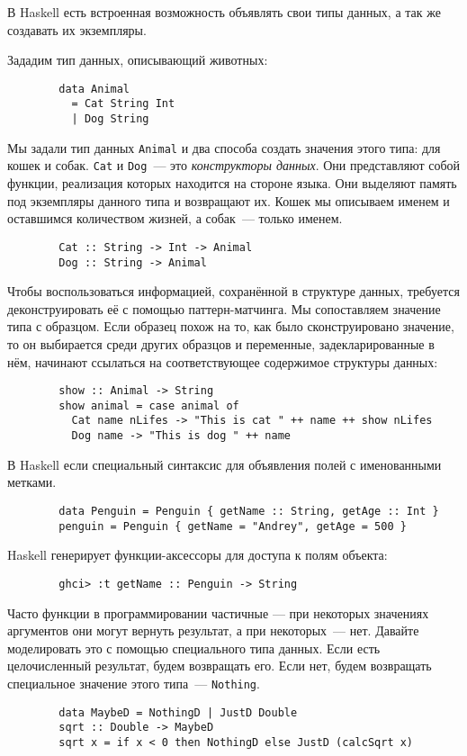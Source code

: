\documentclass[12pt]{article}
\newcommand{\point}[1]{{\color{blue}\textit{#1}}} %
\begin{document}
    В Haskell есть встроенная возможность объявлять свои типы данных, а так же создавать их экземпляры.

    Зададим тип данных, описывающий животных:
    \begin{verbatim}
        data Animal
          = Cat String Int
          | Dog String
    \end{verbatim}

    Мы задали тип данных \texttt{Animal} и два способа создать значения этого типа: для кошек и собак.
    \texttt{Cat} и \texttt{Dog}~--- это \point{конструкторы данных}.
    Они представляют собой функции, реализация которых находится на стороне языка.
    Они выделяют память под экземпляры данного типа и возвращают их.
    Кошек мы описываем именем и оставшимся количеством жизней, а собак~--- только именем.
    \begin{verbatim}
        Cat :: String -> Int -> Animal
        Dog :: String -> Animal
    \end{verbatim}

    Чтобы воспользоваться информацией, сохранённой в структуре данных, требуется деконструировать её с помощью паттерн-матчинга.
    Мы сопоставляем значение типа с образцом.
    Если образец похож на то, как было сконструировано значение, то он выбирается среди других образцов и переменные, задекларированные в нём, начинают ссылаться на соответствующее содержимое структуры данных:
    \begin{verbatim}
        show :: Animal -> String
        show animal = case animal of
          Cat name nLifes -> "This is cat " ++ name ++ show nLifes
          Dog name -> "This is dog " ++ name
    \end{verbatim}

    В Haskell если специальный синтаксис для объявления полей с именованными метками.
    \begin{verbatim}
        data Penguin = Penguin { getName :: String, getAge :: Int }
        penguin = Penguin { getName = "Andrey", getAge = 500 }
    \end{verbatim}
    Haskell генерирует функции-аксессоры для доступа к полям объекта:
    \begin{verbatim}
        ghci> :t getName :: Penguin -> String
    \end{verbatim}

    Часто функции в программировании частичные --- при некоторых значениях аргументов они могут вернуть результат, а при некоторых~--- нет.
    Давайте моделировать это с помощью специального типа данных.
    Если есть целочисленный результат, будем возвращать его.
    Если нет, будем возвращать специальное значение этого типа~--- \texttt{Nothing}.
    \begin{verbatim}
        data MaybeD = NothingD | JustD Double
        sqrt :: Double -> MaybeD
        sqrt x = if x < 0 then NothingD else JustD (calcSqrt x)
    \end{verbatim}
\end{document}

